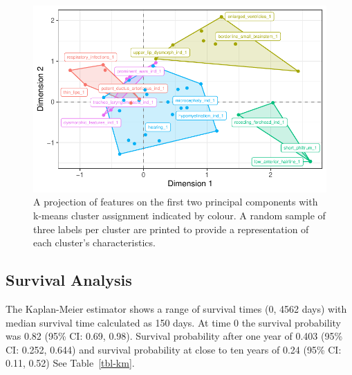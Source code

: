 \documentclass[
  letterpaper,
  DIV=11,
  numbers=noendperiod]{scrartcl}
\begin{document}
\begin{figure}

{\centering \includegraphics{paper_files/figure-pdf/fig-clust-1.pdf}

}

\caption{\label{fig-clust}A projection of features on the first two
principal components with k-means cluster assignment indicated by
colour. A random sample of three labels per cluster are printed to
provide a representation of each cluster's characteristics.}

\end{figure}

\hypertarget{survival-analysis-1}{%
\subsection{Survival Analysis}\label{survival-analysis-1}}

The Kaplan-Meier estimator shows a range of survival times (0, 4562
days) with median survival time calculated as 150 days. At time 0 the
survival probability was 0.82 (95\% CI: 0.69, 0.98). Survival
probability after one year of 0.403 (95\% CI: 0.252, 0.644) and survival
probability at close to ten years of 0.24 (95\% CI: 0.11, 0.52) See
Table~\ref{tbl-km}.
\end{document}
